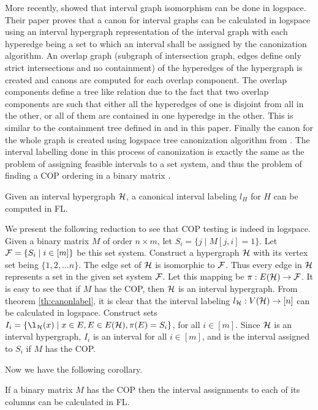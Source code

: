 \documentclass{llncs}
\def\cF{{\cal F}}
\def\cH{{\cal H}}
\begin{document}
\noindent
More recently, \cite{kklv10} showed that interval graph isomorphism
can be done in logspace. Their paper proves that a canon for interval
graphs can be calculated in logspace using an interval hypergraph
representation of the interval graph with each hyperedge being a set
to which an interval shall be assigned by the canonization
algorithm. An overlap graph (subgraph of intersection graph, edges
define only strict intersections and no containment) of the hyperedges
of the hypergraph is created and canons are computed for each overlap
component. The overlap components define a tree like relation due to
the fact that two overlap components are such that either all the
hyperedges of one is disjoint from all in the other, or all of them
are contained in one hyperedge in the other. This is similar to the
containment tree defined in \cite{nsnrs09} and in this paper. Finally
the canon for the whole graph is created using logspace tree
canonization algorithm from \cite{sl92}. The interval labelling done
in this process of canonization is exactly the same as the problem of
assigning feasible intervals to a set system, and thus the problem of
finding a COP ordering in a binary matrix \cite{nsnrs09}.

\begin{theorem} 
\label{th:canonlabel}
Given an interval hypergraph $\cH$, a canonical interval labeling $l_H$ 
for $H$ can be computed in FL.
\end{theorem}


We present the following reduction to see that COP testing is
indeed in logspace. Given a binary matrix $M$ of order $n \times m$,
let $S_i = \{j \mid M[j,i]=1 \}$. Let $\cF = \{S_i \mid i \in [m] \}$
be this set system. Construct a hypergraph $\cH$ with its vertex set
being $\{1, 2, \dots n\}$. The edge set of $\cH$ is isomorphic to
$\cF$. Thus every edge in $\cH$ represents a set in the given set
system $\cF$. Let this mapping be $\pi: E(\cH) \rightarrow \cF$. It is
easy to see that if $M$ has the COP, then $\cH$ is an interval
hypergraph. From theorem \ref{th:canonlabel}, it is clear that the
interval labeling $l_{\cH}: V(\cH) \rightarrow [n]$ can be calculated
in logspace. Construct sets $I_i = \{ \l_{\cH}(x) \mid x \in E, E \in
E(\cH), \pi(E) = S_i\}$, for all $i \in [m]$. Since $\cH$ is an
interval hypergraph, $I_i$ is an interval for all $i \in [m]$, and is
the interval assigned to $S_i$ if $M$ has the COP.

Now we have the following corollary.
\begin{corollary}
\label{cor:coplog}
  If a binary matrix $M$ has the COP then the interval assignments to each
  of its columns can be calculated in FL.
\end{corollary}
\end{document}
